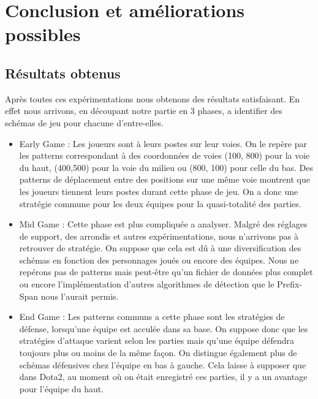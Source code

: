 \documentclass{article}
\begin{document}
    \section{Conclusion et améliorations possibles}
        \subsection{Résultats obtenus}
        Après toutes ces expérimentations nous obtenons des résultats satisfaisant. En effet nous arrivons, en découpant notre partie en 3 phases, a identifier des schémas de jeu pour chacune d'entre-elles.

        \begin{itemize}
            \item Early Game : Les joueurs sont à leurs postes sur leur voies. On le repère par les patterns correspondant à des coordonnées de voies (100, 800) pour la voie du haut, (400,500) pour la voie du milieu ou (800, 100) pour celle du bas. Des patterns de déplacement entre des positions sur une même voie montrent que les joueurs tiennent leurs postes durant cette phase de jeu. On a donc une stratégie commune pour les deux équipes pour la quasi-totalité des parties.

            \item Mid Game : Cette phase est plus compliquée a analyser. Malgré des réglages de support, des arrondis et autres expérimentations, nous n'arrivons pas à retrouver de stratégie. On suppose que cela est dû à une diversification des schémas en fonction des personnages joués ou encore des équipes. Nous ne repérons pas de patterns mais peut-être qu'un fichier de données plus complet ou encore l'implémentation d'autres algorithmes de détection que le Prefix-Span nous l'aurait permis.

            \item End Game : Les patterns communs a cette phase sont les stratégies de défense, lorsqu'une équipe est acculée dans sa base. On suppose donc que les stratégies d'attaque varient selon les parties mais qu'une équipe défendra toujours plus ou moins de la même façon. On distingue également plus de schémas défensives chez l'équipe en bas à gauche. Cela laisse à supposer que dans Dota2, au moment où on était enregistré ces parties, il y a un avantage pour l'équipe du haut.
        \end{itemize}
\end{document}
